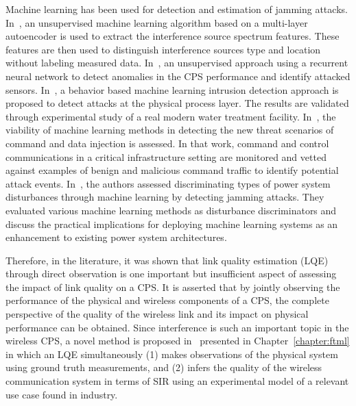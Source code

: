 Machine learning has been used for detection and estimation of jamming attacks. In~\cite{Chen2019}, an unsupervised machine learning algorithm based on a multi-layer autoencoder is used to extract the interference source spectrum features. These features are then used to distinguish interference sources type and location without labeling measured data. In~\cite{7911887},  an unsupervised approach using a recurrent neural network to detect anomalies in the CPS performance and identify attacked sensors. In~\cite{Junejo2016DataDP}, a behavior based machine learning intrusion detection approach  is proposed to detect attacks at the physical process layer. The results are validated through experimental study of a real modern water treatment facility. In~\cite{Beaver:2013:EML:2584691.2584722}, the viability of machine learning methods in detecting the new threat scenarios of command and data injection is assessed. In that work, command and control communications in a critical infrastructure setting are monitored and vetted against examples of benign and malicious command traffic to identify potential attack events. In~\cite{6900095}, the authors assessed discriminating types of power system disturbances through machine learning by detecting jamming attacks. They evaluated various machine learning methods as disturbance discriminators and discuss the practical implications for deploying machine learning systems as an enhancement to existing power system architectures.

Therefore, in the literature, it was shown that link quality estimation (LQE) through direct observation is one important but insufficient aspect of assessing the impact of link quality on a CPS. It is asserted that by jointly observing the performance of the physical and wireless components of a CPS, the complete perspective of the quality of the wireless link and its impact on physical performance can be obtained. Since interference is such an important topic in the wireless CPS, a novel method is proposed in~\cite{Candell_ISIT_2019,Candell2020.Jrnl.Access} presented in Chapter~\ref{chapter:ftml} in which an LQE simultaneously (1) makes observations of the physical system using ground truth measurements, and (2) infers the quality of the wireless communication system in terms of SIR using an experimental model of a relevant use case found in industry.


